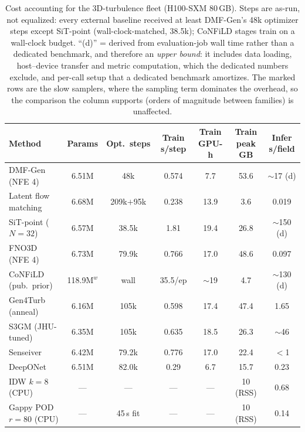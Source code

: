 \documentclass[aip,pof,reprint,amsmath,amssymb,superscriptaddress]{revtex4-1}
\newcommand{\dmfgen}{DMF-Gen}
\begin{document}
\begin{table}[tbp]
\caption{\label{tab:jhucost}Cost accounting for the 3D-turbulence fleet
(H100-SXM 80\,GB). Steps are as-run, not equalized: every external baseline
received at least \dmfgen{}'s 48k optimizer steps except SiT-point
(wall-clock-matched, 38.5k); CoNFiLD stages train on a wall-clock budget.
``(d)'' = derived from evaluation-job wall time rather than a dedicated
benchmark, and therefore an \emph{upper bound}: it includes data loading,
host--device transfer and metric computation, which the dedicated numbers
exclude, and per-call setup that a dedicated benchmark amortizes. The marked
rows are the slow samplers, where the sampling term dominates the overhead, so
the comparison the column supports (orders of magnitude between families) is
unaffected.}
\footnotesize
\begin{ruledtabular}
\begin{tabular}{lcccccc}
Method & Params & Opt.\ steps & Train s/step & Train GPU-h & Train peak GB & Infer s/field \\
\hline
\dmfgen{} (NFE 4) & 6.51M & 48k & 0.574 & 7.7 & 53.6 & ${\sim}$17 (d) \\
Latent flow matching & 6.68M & 209k$+$95k & 0.238 & 13.9 & 3.6 & 0.019 \\
SiT-point ($N{=}32$) & 6.57M & 38.5k & 1.81 & 19.4 & 26.8 & ${\sim}$150 (d) \\
FNO3D (NFE 4) & 6.73M & 79.9k & 0.766 & 17.0 & 48.6 & 0.097 \\
CoNFiLD (pub.\ prior) & 118.9M$^{w}$ & wall & 35.5/ep & ${\sim}$19 & 4.7 & ${\sim}$130 (d) \\
Gen4Turb (anneal) & 6.16M & 105k & 0.598 & 17.4 & 47.4 & 1.65 \\
S3GM (JHU-tuned) & 6.35M & 105k & 0.635 & 18.5 & 26.3 & ${\sim}$46 \\
Senseiver & 6.42M & 79.2k & 0.776 & 17.0 & 22.4 & $<$1 \\
DeepONet & 6.51M & 82.0k & 0.29 & 6.7 & 15.7 & 0.23 \\
IDW $k{=}8$ (CPU) & --- & --- & --- & --- & 10 (RSS) & 0.68 \\
Gappy POD $r{=}80$ (CPU) & --- & 45\,s fit & --- & --- & 10 (RSS) & 0.14 \\
\end{tabular}
\end{ruledtabular}
\end{table}
\end{document}
